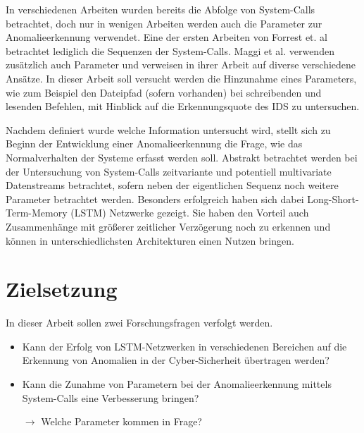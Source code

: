 In verschiedenen Arbeiten wurden bereits die Abfolge von System-Calls betrachtet, doch nur in wenigen Arbeiten werden auch die Parameter zur Anomalieerkennung verwendet. Eine der ersten Arbeiten von Forrest et. al \cite{FORREST} betrachtet lediglich die Sequenzen der System-Calls. Maggi et al. verwenden zusätzlich auch Parameter und verweisen in ihrer Arbeit \cite{MAGGI} auf diverse verschiedene Ansätze.
In dieser Arbeit soll versucht werden die Hinzunahme eines Parameters, wie zum Beispiel den Dateipfad (sofern vorhanden) bei schreibenden und lesenden Befehlen, mit Hinblick auf die Erkennungsquote des IDS zu untersuchen.

Nachdem definiert wurde welche Information untersucht wird, stellt sich zu Beginn der Entwicklung einer Anomalieerkennung die Frage, wie das Normalverhalten der Systeme erfasst werden soll.
Abstrakt betrachtet werden bei der Untersuchung von System-Calls zeitvariante und potentiell multivariate Datenstreams betrachtet, sofern neben der eigentlichen Sequenz noch weitere Parameter betrachtet werden.
Besonders erfolgreich haben sich dabei Long-Short-Term-Memory (LSTM) Netzwerke gezeigt.
Sie haben den Vorteil auch Zusammenhänge mit größerer zeitlicher Verzögerung noch zu erkennen \cite{HOCHREITER} und können in unterschiedlichsten Architekturen einen Nutzen bringen. %

\section{Zielsetzung}

In dieser Arbeit sollen zwei Forschungsfragen verfolgt werden.
\begin{itemize}
    \item Kann der Erfolg von LSTM-Netzwerken in verschiedenen Bereichen auf die Erkennung von Anomalien in der Cyber-Sicherheit übertragen werden?
    \item Kann die Zunahme von Parametern bei der Anomalieerkennung mittels System-Calls eine Verbesserung bringen?

        $\rightarrow$ Welche Parameter kommen in Frage?
\end{itemize}

